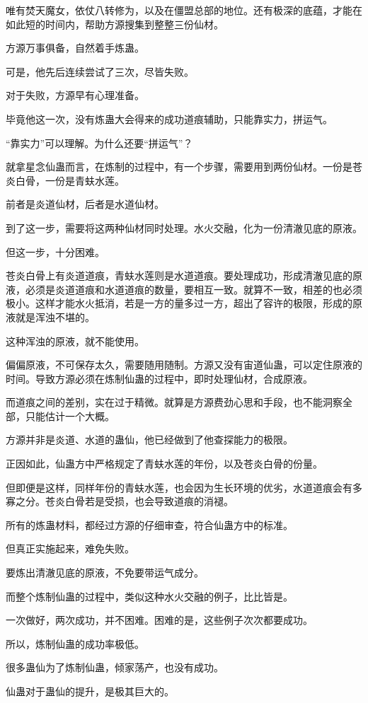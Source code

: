 \begin{this_body}
唯有焚天魔女，依仗八转修为，以及在僵盟总部的地位。还有极深的底蕴，才能在如此短的时间内，帮助方源搜集到整整三份仙材。

方源万事俱备，自然着手炼蛊。

可是，他先后连续尝试了三次，尽皆失败。

对于失败，方源早有心理准备。

毕竟他这一次，没有炼蛊大会得来的成功道痕辅助，只能靠实力，拼运气。

“靠实力”可以理解。为什么还要“拼运气”？

就拿星念仙蛊而言，在炼制的过程中，有一个步骤，需要用到两份仙材。一份是苍炎白骨，一份是青蚨水莲。

前者是炎道仙材，后者是水道仙材。

到了这一步，需要将这两种仙材同时处理。水火交融，化为一份清澈见底的原液。

但这一步，十分困难。

苍炎白骨上有炎道道痕，青蚨水莲则是水道道痕。要处理成功，形成清澈见底的原液，必须是炎道道痕和水道道痕的数量，要相互一致。就算不一致，相差的也必须极小。这样才能水火抵消，若是一方的量多过一方，超出了容许的极限，形成的原液就是浑浊不堪的。

这种浑浊的原液，就不能使用。

偏偏原液，不可保存太久，需要随用随制。方源又没有宙道仙蛊，可以定住原液的时间。导致方源必须在炼制仙蛊的过程中，即时处理仙材，合成原液。

而道痕之间的差别，实在过于精微。就算是方源费劲心思和手段，也不能洞察全部，只能估计一个大概。

方源并非是炎道、水道的蛊仙，他已经做到了他查探能力的极限。

正因如此，仙蛊方中严格规定了青蚨水莲的年份，以及苍炎白骨的份量。

但即便是这样，同样年份的青蚨水莲，也会因为生长环境的优劣，水道道痕会有多寡之分。苍炎白骨若是受损，也会导致道痕的消褪。

所有的炼蛊材料，都经过方源的仔细审查，符合仙蛊方中的标准。

但真正实施起来，难免失败。

要炼出清澈见底的原液，不免要带运气成分。

而整个炼制仙蛊的过程中，类似这种水火交融的例子，比比皆是。

一次做好，两次成功，并不困难。困难的是，这些例子次次都要成功。

所以，炼制仙蛊的成功率极低。

很多蛊仙为了炼制仙蛊，倾家荡产，也没有成功。

仙蛊对于蛊仙的提升，是极其巨大的。


\end{this_body}
